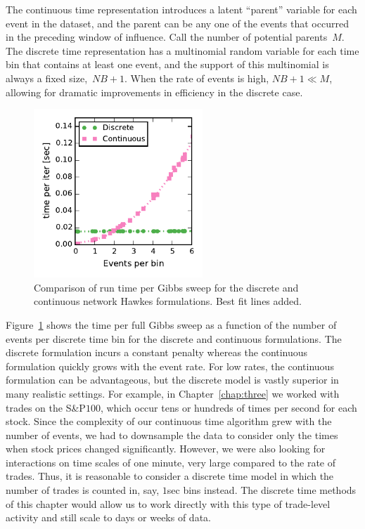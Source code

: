 The continuous time representation introduces a latent ``parent''
variable for each event in the dataset, and the parent can be any one
of the events that occurred in the preceding window of influence. Call
the number of potential parents~$M$. The discrete time representation
has a multinomial random variable for each time bin that contains at least one
event, and the support of this multinomial is always a fixed
size,~${NB+1}$.  When the rate of events is high, $NB+1 \ll M$,
allowing for dramatic improvements in efficiency in the discrete case.

\begin{figure}[t]
  \centering
  \includegraphics[width=2.5in]{figures/ch4/discrete_cont_comparison}
  \caption[Runtime comparison of continuous and discrete time Hawkes models]{
    Comparison of run time per Gibbs sweep for the discrete and continuous network Hawkes formulations. Best fit lines added.}
  \label{fig:disc_vs_cont}
\end{figure}


Figure~\ref{fig:disc_vs_cont} shows the time per full Gibbs sweep as a
function of the number of events per discrete time bin for the
discrete and continuous formulations. The discrete formulation incurs
a constant penalty whereas the continuous formulation quickly grows
with the event rate. For low rates, the continuous formulation can be
advantageous, but the discrete model is vastly superior in many
realistic settings. For example, in Chapter~\ref{chap:three} we worked with
trades on the S\&P$100$, which occur tens or hundreds of times per
second for each stock. Since the complexity of our continuous time algorithm grew
with the number of events, we had to downsample the data to consider only
the times when stock prices changed significantly. However, we
were also looking for interactions on time scales of one minute,
very large compared to the rate of trades. Thus, it is
reasonable to consider a discrete time model in which the number of
trades is counted in, say, $1$sec bins instead. The discrete time
methods of this chapter would allow us to work directly with this type of
trade-level activity and still scale to days or weeks of data.

